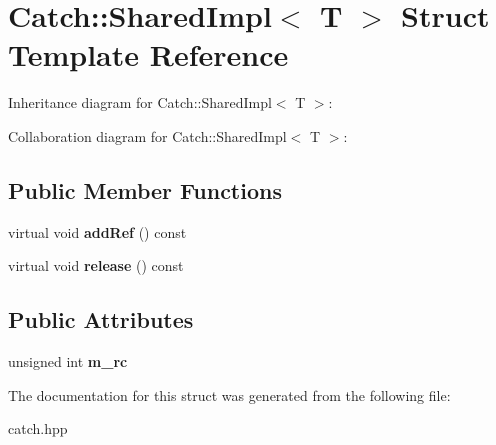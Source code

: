\hypertarget{struct_catch_1_1_shared_impl}{}\section{Catch\+:\+:Shared\+Impl$<$ T $>$ Struct Template Reference}
\label{struct_catch_1_1_shared_impl}


Inheritance diagram for Catch\+:\+:Shared\+Impl$<$ T $>$\+:


Collaboration diagram for Catch\+:\+:Shared\+Impl$<$ T $>$\+:
\subsection*{Public Member Functions}
\begin{DoxyCompactItemize}
\item 
\mbox{\label{struct_catch_1_1_shared_impl_a5d1a4c96e8fc07c821890fd09749062e}} 
virtual void {\bfseries add\+Ref} () const
\item 
\mbox{\label{struct_catch_1_1_shared_impl_ada8052c6f24fd73ec099333626f106fe}} 
virtual void {\bfseries release} () const
\end{DoxyCompactItemize}
\subsection*{Public Attributes}
\begin{DoxyCompactItemize}
\item 
\mbox{\label{struct_catch_1_1_shared_impl_a7e71ef1985b85aa41a1632f932a96bcb}} 
unsigned int {\bfseries m\+\_\+rc}
\end{DoxyCompactItemize}


The documentation for this struct was generated from the following file\+:\begin{DoxyCompactItemize}
\item 
catch.\+hpp\end{DoxyCompactItemize}
